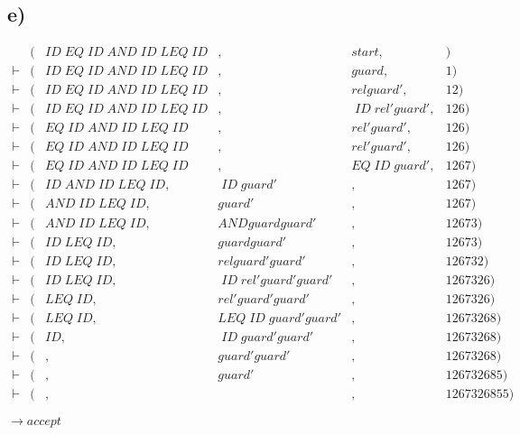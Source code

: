 \subsection*{e)}
\begin{equation*}
  \begin{aligned}
   	   &(&ID\;EQ\;ID\;AND\;ID\;LEQ\;ID&,& start,& )\\
\vdash &(&ID\;EQ\;ID\;AND\;ID\;LEQ\;ID&,& guard,& 1)\\
\vdash &(&ID\;EQ\;ID\;AND\;ID\;LEQ\;ID&,& rel guard',& 12)\\
\vdash &(&ID\;EQ\;ID\;AND\;ID\;LEQ\;ID&,&\;ID\;rel' guard',& 126)\\
\vdash &(&EQ\;ID\;AND\;ID\;LEQ\;ID&,& rel' guard',& 126)\\
\vdash &(&EQ\;ID\;AND\;ID\;LEQ\;ID&,& rel' guard',& 126)\\
\vdash &(&EQ\;ID\;AND\;ID\;LEQ\;ID&,& EQ\;ID\;guard',& 1267)\\
\vdash &(&ID\;AND\;ID\;LEQ\;ID,&\;ID\;guard'&,& 1267)\\
\vdash &(&AND\;ID\;LEQ\;ID,& guard'&,& 1267)\\
\vdash &(&AND\;ID\;LEQ\;ID,& AND guard guard'&,& 12673)\\
\vdash &(&ID\;LEQ\;ID,& guard guard'&,& 12673)\\
\vdash &(&ID\;LEQ\;ID,& rel guard' guard'&,& 126732)\\
\vdash &(&ID\;LEQ\;ID,&\;ID\;rel' guard' guard'&,& 1267326)\\
\vdash &(&LEQ\;ID,& rel' guard' guard'&,& 1267326)\\
\vdash &(&LEQ\;ID,& LEQ\;ID\;guard' guard'&,& 12673268)\\
\vdash &(&ID,&\;ID\;guard' guard'&,& 12673268)\\
\vdash &(&,& guard' guard'&,& 12673268)\\
\vdash &(&,& guard'&,& 126732685)\\
\vdash &(&,& &,& 1267326855)
\end{aligned}
\end{equation*}

$\rightarrow accept$